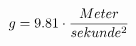 \documentclass[preview]{standalone}
\begin{document}
\begin{align*}
\special{dvisvgm:raw <g id='unique000'>}g = 9.81 \cdot \frac{Meter}{sekunde^{2}}\special{dvisvgm:raw </g>}
\end{align*}
\end{document}

